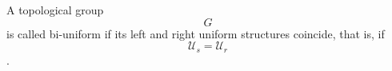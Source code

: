 A topological group $$G$$ is called bi-uniform if its left and right uniform structures coincide, that is, if $$\mathcal{U}_s = \mathcal{U}_r$$.
